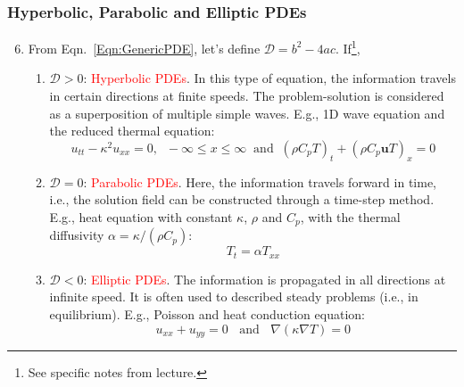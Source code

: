 \documentclass[10pt,compress,handout,ignorenonframetext]{beamer}
\begin{document}
\begin{frame}
 \frametitle{Hyperbolic, Parabolic and Elliptic PDEs} 
 \begin{enumerate}
   \setcounter{enumi}{5}
   \item <1-> From Eqn.~\ref{Eqn:GenericPDE}, let's define $\mathcal{D}=b^{2}-4ac$. If\footnote{See specific notes from lecture.},
     \begin{enumerate}
        \item <2-> $\mathcal{D}>0$: \textcolor{red}{Hyperbolic PDEs}. In this type of equation, the information travels in certain directions at finite speeds. The problem-solution is considered as a superposition of multiple simple waves. E.g., 1D wave equation and the reduced thermal equation:
          \begin{displaymath}
            u_{tt}-\kappa^{2}u_{xx} = 0, \;\; -\infty\leq x\leq \infty \;\;\text{and}\;\; \left(\rho C_{p}T\right)_{t} + \left(\rho C_{p}\bm{u}T\right)_{x}=0
          \end{displaymath} 
        \item <3-> $\mathcal{D}=0$: \textcolor{red}{Parabolic PDEs}. Here, the information travels forward in time, i.e., the solution field can be constructed through a time-step method. E.g., heat equation with constant $\kappa$, $\rho$ and $C_{p}$, with the thermal diffusivity $\alpha=\kappa/\left(\rho C_{p}\right)$:
          \begin{displaymath}
             T_{t} = \alpha T_{xx}
          \end{displaymath}
        \item <4-> $\mathcal{D}<0$: \textcolor{red}{Elliptic PDEs}. The information is propagated in all directions at infinite speed. It is often used to described steady problems (i.e., in equilibrium). E.g., Poisson and heat conduction equation:
          \begin{displaymath}
             u_{xx} +u_{yy} = 0 \;\;\text{ and } \;\; \nabla\left(\kappa\nabla T\right) = 0
          \end{displaymath}
      \end{enumerate}
\end{enumerate}   
 
\end{frame}
\end{document}
